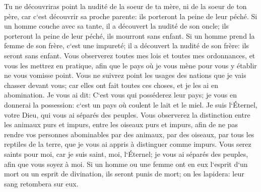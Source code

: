 \verse Tu ne découvriras point la nudité de la soeur de ta mère, ni de la soeur de ton père, car c`est découvrir sa proche parente: ils porteront la peine de leur péché. 
\verse Si un homme couche avec sa tante, il a découvert la nudité de son oncle; ils porteront la peine de leur péché, ils mourront sans enfant. 
\verse Si un homme prend la femme de son frère, c`est une impureté; il a découvert la nudité de son frère: ils seront sans enfant. 
\verse Vous observerez toutes mes lois et toutes mes ordonnances, et vous les mettrez en pratique, afin que le pays où je vous mène pour vous y établir ne vous vomisse point. 
\verse Vous ne suivrez point les usages des nations que je vais chasser devant vous; car elles ont fait toutes ces choses, et je les ai en abomination. 
\verse Je vous ai dit: C`est vous qui posséderez leur pays; je vous en donnerai la possession: c`est un pays où coulent le lait et le miel. Je suis l`Éternel, votre Dieu, qui vous ai séparés des peuples. 
\verse Vous observerez la distinction entre les animaux purs et impurs, entre les oiseaux purs et impurs, afin de ne pas rendre vos personnes abominables par des animaux, par des oiseaux, par tous les reptiles de la terre, que je vous ai appris à distinguer comme impurs. 
\verse Vous serez saints pour moi, car je suis saint, moi, l`Éternel; je vous ai séparés des peuples, afin que vous soyez à moi. 
\verse Si un homme ou une femme ont en eux l`esprit d`un mort ou un esprit de divination, ils seront punis de mort; on les lapidera: leur sang retombera sur eux. 


